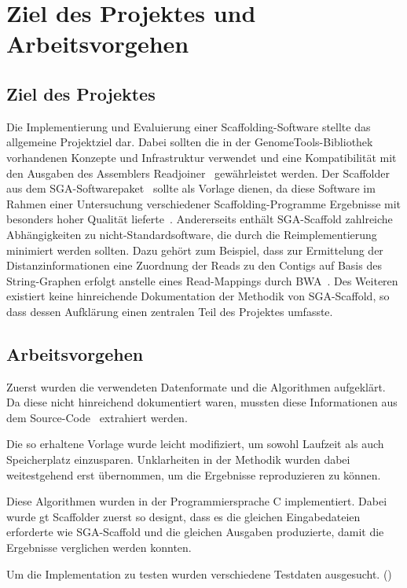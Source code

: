 \documentclass[a4paper,10pt,parskip]{scrartcl}
\begin{document}
\section{Ziel des Projektes und Arbeitsvorgehen}
\subsection{Ziel des Projektes}
Die Implementierung und Evaluierung einer Scaffolding-Software stellte
das allgemeine Projektziel dar. Dabei sollten die in der
GenomeTools-Bibliothek~\cite{Gremme:2013} vorhandenen Konzepte und
Infrastruktur verwendet und eine Kompatibilität mit den Ausgaben des
Assemblers Readjoiner~\cite{Gonnella:2012gn} gewährleistet werden. Der
Scaffolder aus dem SGA-Softwarepaket~\cite{Simpson:2012ef} sollte als
Vorlage dienen, da diese Software im Rahmen einer Untersuchung
verschiedener Scaffolding-Programme Ergebnisse mit besonders hoher
Qualität lieferte~\cite{Hunt:2014dh}. Andererseits enthält
SGA-Scaffold zahlreiche Abhängigkeiten zu nicht-Standardsoftware, die
durch die Reimplementierung minimiert werden sollten. Dazu gehört zum
Beispiel, dass zur Ermittelung der Distanzinformationen eine Zuordnung
der Reads zu den Contigs auf Basis des String-Graphen erfolgt anstelle
eines Read-Mappings durch BWA~\cite{Li:2009}. Des Weiteren existiert
keine hinreichende Dokumentation der Methodik von SGA-Scaffold, so
dass dessen Aufklärung einen zentralen Teil des Projektes umfasste.

\subsection{Arbeitsvorgehen}
Zuerst wurden die verwendeten Datenformate und die Algorithmen
aufgeklärt. Da diese nicht hinreichend dokumentiert waren, mussten
diese Informationen aus dem Source-Code~\cite{source} extrahiert werden.

Die so erhaltene Vorlage wurde leicht modifiziert, um sowohl Laufzeit
als auch Speicherplatz einzusparen. Unklarheiten in der Methodik wurden
dabei weitestgehend erst übernommen, um die Ergebnisse reproduzieren
zu können.

Diese Algorithmen wurden in der Programmiersprache C
implementiert. Dabei wurde gt Scaffolder zuerst so designt, dass es
die gleichen Eingabedateien erforderte wie SGA-Scaffold und die
gleichen Ausgaben produzierte, damit die Ergebnisse verglichen werden
konnten.

Um die Implementation zu testen wurden verschiedene Testdaten
ausgesucht. ()
\end{document}

